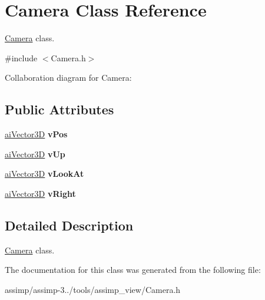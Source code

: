 \hypertarget{class_camera}{\section{Camera Class Reference}
\label{class_camera}
}


\hyperlink{class_camera}{Camera} class.  




{\ttfamily \#include $<$Camera.\+h$>$}



Collaboration diagram for Camera\+:
\subsection*{Public Attributes}
\begin{DoxyCompactItemize}
\item 
\hypertarget{class_camera_a5f94c81ee1c7ae900d5a86de5256c9ac}{\hyperlink{structai_vector3_d}{ai\+Vector3\+D} {\bfseries v\+Pos}}\label{class_camera_a5f94c81ee1c7ae900d5a86de5256c9ac}

\item 
\hypertarget{class_camera_ae44bb0a918d9416fcb7c4a95d7497f8e}{\hyperlink{structai_vector3_d}{ai\+Vector3\+D} {\bfseries v\+Up}}\label{class_camera_ae44bb0a918d9416fcb7c4a95d7497f8e}

\item 
\hypertarget{class_camera_acc563ed695ce4f83292e2d4607c0e716}{\hyperlink{structai_vector3_d}{ai\+Vector3\+D} {\bfseries v\+Look\+At}}\label{class_camera_acc563ed695ce4f83292e2d4607c0e716}

\item 
\hypertarget{class_camera_a73a713a1def525bb21d74e0184e2f64a}{\hyperlink{structai_vector3_d}{ai\+Vector3\+D} {\bfseries v\+Right}}\label{class_camera_a73a713a1def525bb21d74e0184e2f64a}

\end{DoxyCompactItemize}


\subsection{Detailed Description}
\hyperlink{class_camera}{Camera} class. 

The documentation for this class was generated from the following file\+:\begin{DoxyCompactItemize}
\item 
assimp/assimp-\/3../tools/assimp\+\_\+view/Camera.\+h\end{DoxyCompactItemize}
